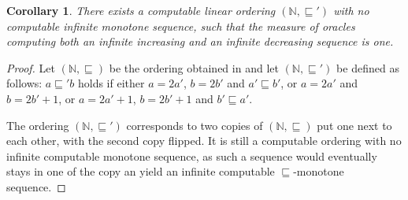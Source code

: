 \documentclass{article}
\numberwithin{theorem}{section}
\newtheorem{corollary}[theorem]{Corollary}
\newcommand{\NN}[0]{\mathbb{N}}
\begin{document}
\begin{corollary}
There exists a computable linear ordering $(\NN, \sqsubseteq')$ with no computable infinite monotone sequence,
such that the measure of oracles computing both an infinite increasing and an infinite decreasing sequence is one.
\end{corollary}
\begin{proof}
Let $(\NN, \sqsubseteq)$ be the ordering obtained in  and let $(\NN, \sqsubseteq')$ be defined as follows: $a \sqsubseteq' b$ holds if either $a = 2a'$, $b = 2b'$ and $a' \sqsubseteq b'$, or $a = 2a'$ and $b = 2b'+1$, or $a = 2a'+1$, $b = 2b' + 1$ and $b' \sqsubseteq a'$.

The ordering $(\NN, \sqsubseteq')$ corresponds to two copies of $(\NN, \sqsubseteq)$ put one next to each other, with the second copy flipped. It is still a computable ordering with no infinite computable monotone sequence, as such a sequence would eventually stays in one of the copy an yield an infinite computable $\sqsubseteq$-monotone sequence.
\end{proof}
\end{document}
